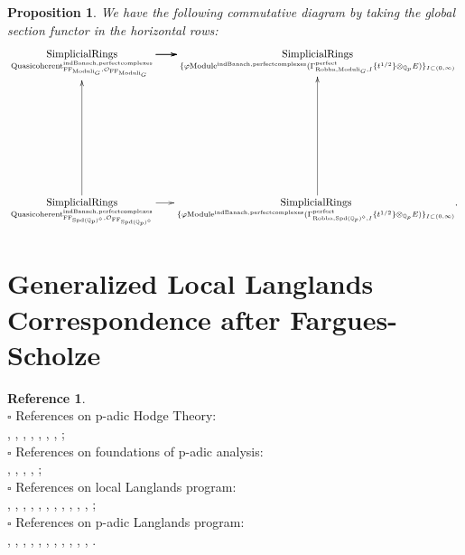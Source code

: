 \documentclass[12pt]{book}
\newtheorem{proposition}{Proposition}
\theoremstyle{definition}
\newtheorem{reference}{Reference}
\begin{document}
\begin{proposition}
We have the following commutative diagram by taking the global section functor in the horizontal rows:
\[\displayindent=+0in
\xymatrix@C-0.1in@R+7pc{
\underset{\mathrm{Quasicoherent}^{\mathrm{indBanach,perfectcomplexes}}_{\mathrm{FF}_{\mathrm{Moduli}_G},\mathcal{O}_{\mathrm{FF}_{\mathrm{Moduli}_G}}}}{\mathrm{SimplicialRings}}  \ar[r] \ar[r] \ar[r] &\underset{\{\varphi\mathrm{Module}^{\mathrm{indBanach,perfectcomplexes}}(\Gamma^\text{perfect}_{\text{Robba},{\mathrm{Moduli}_G},I}\{t^{1/2}\}\otimes_{\mathbb{Q}_p}E)\}_{I\subset (0,\infty)}}{\mathrm{SimplicialRings}}   \\
\underset{\mathrm{Quasicoherent}^{\mathrm{indBanach,perfectcomplexes}}_{\mathrm{FF}_{\mathrm{Spd}(\mathbb{Q}_p)^\diamond},\mathcal{O}_{\mathrm{FF}_{\mathrm{Spd}(\mathbb{Q}_p)^\diamond}}}}{\mathrm{SimplicialRings}} \ar[u]\ar[r] &\underset{\{\varphi\mathrm{Module}^{\mathrm{indBanach,perfectcomplexes}}(\Gamma^\text{perfect}_{\text{Robba},{\mathrm{Spd}(\mathbb{Q}_p)^\diamond},I}\{t^{1/2}\}\otimes_{\mathbb{Q}_p}E)\}_{I\subset (0,\infty)}}{\mathrm{SimplicialRings}}.\ar[u]  
}
\]

\end{proposition}



\newpage
\section{Generalized Local Langlands Correspondence after Fargues-Scholze}

\begin{reference}\mbox{}\\
$\square$ References on p-adic Hodge Theory:\\ \cite{pHodgeT}, \cite{pHodgeF}, \cite{pHodgeS1}, \cite{pHodgeS2}, \cite{pHodgeKL1}, \cite{pHodgeKL2}, \cite{pHodgeBS}, \cite{pHodgeKPX};\\
$\square$ References on foundations of p-adic analysis:\\
\cite{pToAnCS1}, \cite{pToAnCS2}, \cite{pToAnCS3}, \cite{pToAnCS4},  
\cite{pToAnBBBK};\\
$\square$ References on local Langlands program:\\ 
\cite{LPL}, \cite{LPD1}, \cite{LPLL}, \cite{LPVL}, \cite{LPC}, \cite{LPFS}, \cite{LPGL}, \cite{LPEGH}, \cite{LPEG}, \cite{LPZ}, \cite{LPDHKM}, \cite{LPD2};\\
$\square$ References on p-adic Langlands program:\\\cite{LPL}, \cite{LPD1}, \cite{LPLL}, \cite{LPVL}, \cite{LPC}, \cite{LPFS}, \cite{LPGL}, \cite{LPEGH}, \cite{LPEG}, \cite{LPZ}, \cite{LPDHKM}, \cite{LPD2}.
\end{reference}
\end{document}
